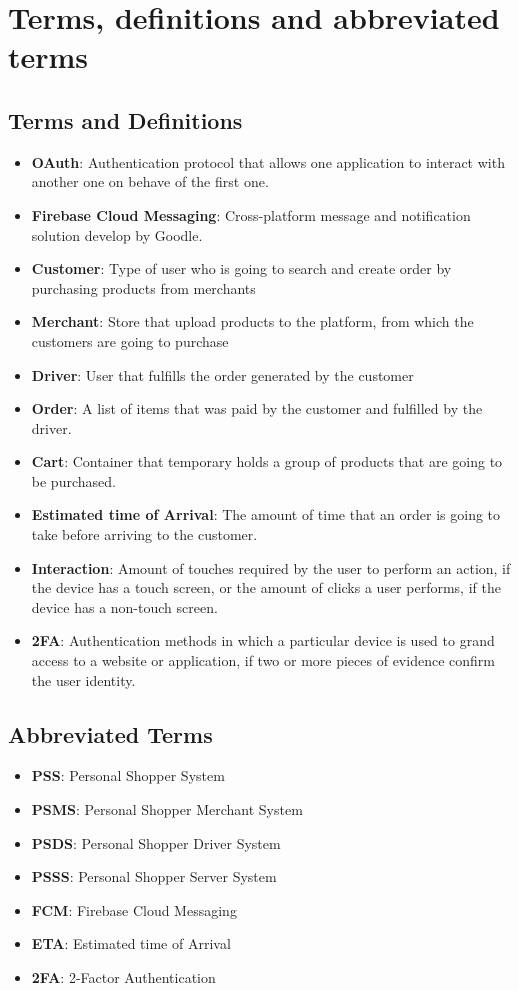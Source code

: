 \section{Terms, definitions and abbreviated terms}
\subsection{Terms and Definitions}
\begin{itemize}
    \item \textbf{OAuth}: Authentication protocol that allows one application 
    to interact with another one on behave of the first one.
    \item \textbf{Firebase Cloud Messaging}: Cross-platform message and 
    notification solution develop by Goodle.
    \item \textbf{Customer}: Type of user who is going to search and create 
    order by purchasing products from merchants
    \item \textbf{Merchant}: Store that upload products to the platform, from
    which the customers are going to purchase 
    \item \textbf{Driver}: User that fulfills the order generated by the 
    customer 
    \item \textbf{Order}: A list of items that was paid by the customer and 
    fulfilled by the driver.
    \item \textbf{Cart}: Container that temporary holds a group of products 
    that are going to be purchased.
    \item \textbf{Estimated time of Arrival}: The amount of time that 
    an order is going to take before arriving to the customer.
    \item \textbf{Interaction}: Amount of touches required by the user to 
    perform an action, if the device has a touch screen, or the amount of 
    clicks a user performs, if the device has a non-touch screen.
    \item \textbf{2FA}: Authentication methods in which a particular device is 
    used to grand access to a website or application, if two or more pieces of 
    evidence confirm the user identity.
\end{itemize}

\subsection{Abbreviated Terms}
\begin{itemize}
    \item \textbf{PSS}: Personal Shopper System
    \item \textbf{PSMS}: Personal Shopper Merchant System
    \item \textbf{PSDS}: Personal Shopper Driver System
    \item \textbf{PSSS}: Personal Shopper Server System
    \item \textbf{FCM}: Firebase Cloud Messaging
    \item \textbf{ETA}: Estimated time of Arrival
    \item \textbf{2FA}: 2-Factor Authentication
\end{itemize}

